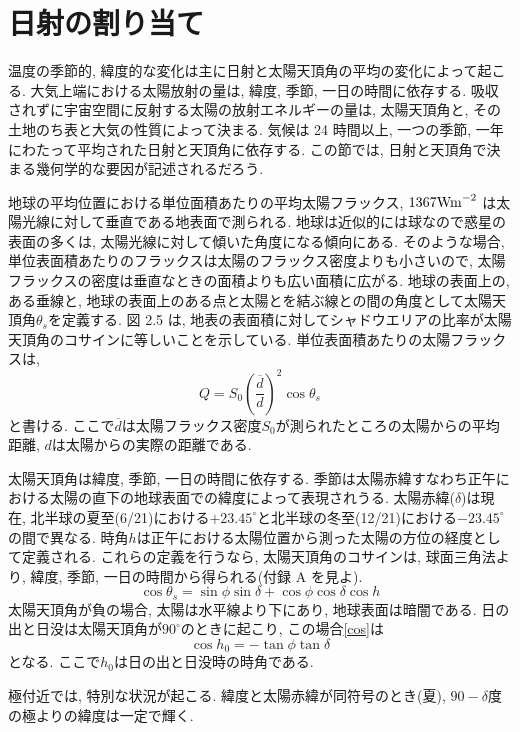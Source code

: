 \documentclass[a4j,12pt,openbib,oneside,dvipdfmx]{jbook}
\begin{document}
\section{日射の割り当て}
温度の季節的, 緯度的な変化は主に日射と太陽天頂角の平均の変化によって起こる. 大気上端における太陽放射の量は, 緯度, 季節, 一日の時間に依存する. 吸収されずに宇宙空間に反射する太陽の放射エネルギーの量は, 太陽天頂角と, その土地のち表と大気の性質によって決まる. 気候は 24 時間以上, 一つの季節, 一年にわたって平均された日射と天頂角に依存する. この節では, 日射と天頂角で決まる幾何学的な要因が記述されるだろう.
\par
地球の平均位置における単位面積あたりの平均太陽フラックス, $1367\rm{Wm}^{-2}$
は太陽光線に対して垂直である地表面で測られる. 
地球は近似的には球なので惑星の表面の多くは, 太陽光線に対して傾いた角度になる傾向にある. 
そのような場合, 単位表面積あたりのフラックスは太陽のフラックス密度よりも小さいので, 太陽フラックスの密度は垂直なときの面積よりも広い面積に広がる. 
地球の表面上の, ある垂線と, 地球の表面上のある点と太陽とを結ぶ線との間の角度として太陽天頂角$\theta_s$を定義する. 
図 2.5 は, 地表の表面積に対してシャドウエリアの比率が太陽天頂角のコサインに等しいことを示している. 
単位表面積あたりの太陽フラックスは,
\begin{equation}
  Q=S_0\left(\frac{\overline{d}}{d}\right)^2\cos{\theta_s}
\end{equation}
と書ける. ここで$\overline{d}$は太陽フラックス密度$S_0$が測られたところの太陽からの平均距離, $d$は太陽からの実際の距離である.
\par
太陽天頂角は緯度, 季節, 一日の時間に依存する. 季節は太陽赤緯すなわち正午における太陽の直下の地球表面での緯度によって表現されうる. 
太陽赤緯($\delta$)は現在, 北半球の夏至(6/21)における$+23.45^\circ$と北半球の冬至(12/21)における$-23.45^\circ$の間で異なる.
時角$h$は正午における太陽位置から測った太陽の方位の経度として定義される.
これらの定義を行うなら, 太陽天頂角のコサインは, 球面三角法より, 緯度, 季節, 一日の時間から得られる(付録 A を見よ).
\begin{equation}
  \cos{\theta_s}=\sin\phi\sin\delta+\cos\phi\cos\delta\cos{h} \label{cos}
\end{equation}
太陽天頂角が負の場合, 太陽は水平線より下にあり, 地球表面は暗闇である.
日の出と日没は太陽天頂角が$90^\circ$のときに起こり, この場合\eqref{cos}は
\begin{equation}
  \cos{h_0}=-\tan\phi\tan\delta
\end{equation}
となる. ここで$h_0$は日の出と日没時の時角である.
\par
極付近では, 特別な状況が起こる. 緯度と太陽赤緯が同符号のとき(夏), $90-\delta$度の極よりの緯度は一定で輝く. 
\end{document}
